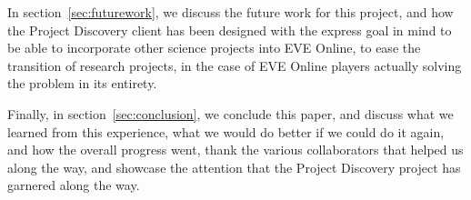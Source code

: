In section~\ref{sec:futurework}, we discuss the future work for this project, and how the Project Discovery client has been designed with the express goal in mind to be able to incorporate other science projects into EVE Online, to ease the transition of research projects, in the case of EVE Online players actually solving the problem in its entirety.

Finally, in section~\ref{sec:conclusion}, we conclude this paper, and discuss what we learned from this experience, what we would do better if we could do it again, and how the overall progress went, thank the various collaborators that helped us along the way, and showcase the attention that the Project Discovery project has garnered along the way.
